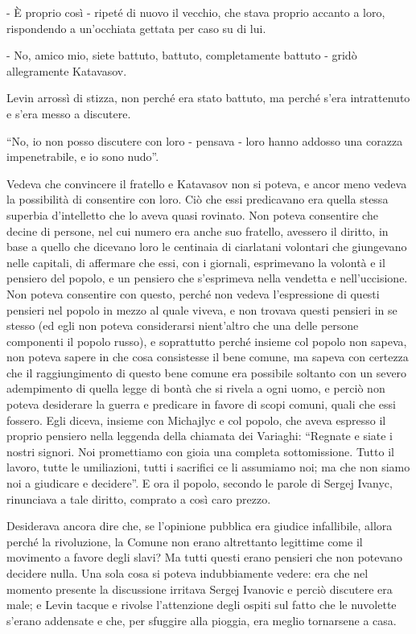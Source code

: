 - È proprio così - ripeté di nuovo il vecchio, che stava proprio accanto a loro, rispondendo a un'occhiata gettata per caso su di lui. 

- No, amico mio, siete battuto, battuto, completamente battuto - gridò allegramente Katavasov. 

Levin arrossì di stizza, non perché era stato battuto, ma perché s'era intrattenuto e s'era messo a discutere. 

``No, io non posso discutere con loro - pensava - loro hanno addosso una corazza impenetrabile, e io sono nudo''. 

Vedeva che convincere il fratello e Katavasov non si poteva, e ancor meno vedeva la possibilità di consentire con loro. Ciò che essi predicavano era quella stessa superbia d'intelletto che lo aveva quasi rovinato. Non poteva consentire che decine di persone, nel cui numero era anche suo fratello, avessero il diritto, in base a quello che dicevano loro le centinaia di ciarlatani volontari che giungevano nelle capitali, di affermare che essi, con i giornali, esprimevano la volontà e il pensiero del popolo, e un pensiero che s'esprimeva nella vendetta e nell'uccisione. Non poteva consentire con questo, perché non vedeva l'espressione di questi pensieri nel popolo in mezzo al quale viveva, e non trovava questi pensieri in se stesso (ed egli non poteva considerarsi nient'altro che una delle persone componenti il popolo russo), e soprattutto perché insieme col popolo non sapeva, non poteva sapere in che cosa consistesse il bene comune, ma sapeva con certezza che il raggiungimento di questo bene comune era possibile soltanto con un severo adempimento di quella legge di bontà che si rivela a ogni uomo, e perciò non poteva desiderare la guerra e predicare in favore di scopi comuni, quali che essi fossero. Egli diceva, insieme con Michajlyc e col popolo, che aveva espresso il proprio pensiero nella leggenda della chiamata dei Variaghi: ``Regnate e siate i nostri signori. Noi promettiamo con gioia una completa sottomissione. Tutto il lavoro, tutte le umiliazioni, tutti i sacrifici ce li assumiamo noi; ma che non siamo noi a giudicare e decidere''. E ora il popolo, secondo le parole di Sergej Ivanyc, rinunciava a tale diritto, comprato a così caro prezzo. 

Desiderava ancora dire che, se l'opinione pubblica era giudice infallibile, allora perché la rivoluzione, la Comune non erano altrettanto legittime come il movimento a favore degli slavi? Ma tutti questi erano pensieri che non potevano decidere nulla. Una sola cosa si poteva indubbiamente vedere: era che nel momento presente la discussione irritava Sergej Ivanovic e perciò discutere era male; e Levin tacque e rivolse l'attenzione degli ospiti sul fatto che le nuvolette s'erano addensate e che, per sfuggire alla pioggia, era meglio tornarsene a casa. 

